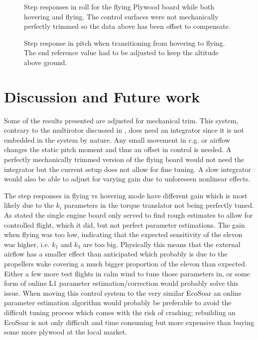 \documentclass{article}
\begin{document}
\begin{figure}[]
    
    \caption{Step responses in roll for the flying Plywood board while both hovering and flying. The control surfaces were not mechanically perfectly trimmed so the data above has been offset to compensate.}
    \label{fig:rollstep}
\end{figure}

\begin{figure}[]
    
    \caption{Step response in pitch when transitioning from hovering to flying. The end reference value had to be adjusted to keep the altitude above ground.}
    \label{fig:transition}
\end{figure}



\section{Discussion and Future work}

Some of the results presented are adjusted for mechanical trim.
This system, contrary to the multirotor discussed in \cite{P2}, does need an integrator since it is not embedded in the system by nature.
Any small movement in c.g. or airflow changes the static pitch moment and thus an offset in control is needed.
A perfectly mechanically trimmed version of the flying board would not need the integrator but the current setup does not allow for fine tuning.
A slow integrator would also be able to adjust for varying gain due to unforeseen nonlinear effects.

The step responses in flying vs hovering mode have different gain which is most likely due to the $k_i$ parameters in the torque translator not being perfectly tuned.
As stated the single engine board only served to find rough estimates to allow for controlled flight, which it did, but not perfect parameter estimations.
The gain when flying was too low, indicating that the expected sensitivity of the elevon was higher, i.e. $k_1$ and $k_3$ are too big.
Physically this means that the external airflow has a smaller effect than anticipated which probably is due to the propellers wake covering a much bigger proportion of the elevon than expected.
Either a few more test flights in calm wind to tune those parameters in, or some form of online L1 parameter estimation/correction would probably solve this issue.
When moving this control system to the very similar EcoSoar an online parameter estimation algorithm would probably be preferable to avoid the difficult tuning process which comes with the risk of crashing; rebuilding an EcoSoar is not only difficult and time consuming but more expensive than buying some more plywood at the local market.
\end{document}
